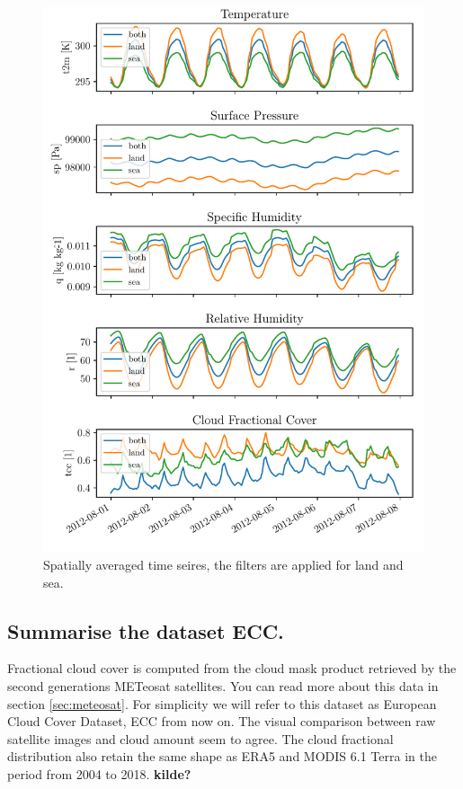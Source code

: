 \begin{figure}
    \centering
    \includegraphics{python_figs/spatially_averaged_one_week_from_2012-08-01.pdf}
    \caption{Spatially averaged time seires, the filters are applied for land and sea.}
    \label{fig:monthly_mean_ts_vars}
\end{figure}

\subsection{Summarise the dataset ECC.}
Fractional cloud cover is computed from the cloud mask product retrieved by the second generations METeosat satellites. You can read more about this data in section \ref{sec:meteosat}. For simplicity we will refer to this dataset as European Cloud Cover Dataset, ECC from now on. The visual comparison between raw satellite images and cloud amount seem to agree. The cloud fractional distribution also retain the same shape as ERA5 and MODIS 6.1 Terra in the period from 2004 to 2018. \textbf{kilde?}

